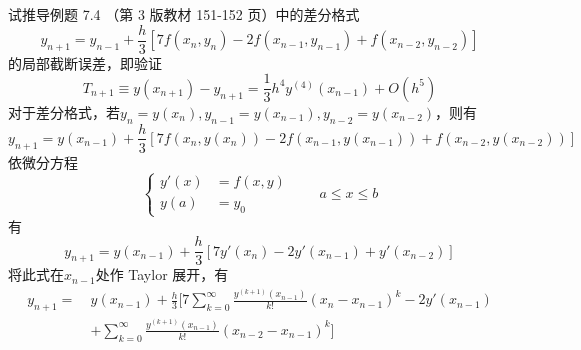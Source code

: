 \documentclass[11pt]{article}
\begin{document}
\maketitle

\thispagestyle{empty}

\newpage

\begin{question}

    \questiontext
    {
        试推导例题 7.4 （第 3 版教材 151-152 页）中的差分格式
        $$
            y_{n + 1} = y_{n - 1} + \frac{h}{3}\left[7f(x_{n}, y_{n}) - 2f(x_{n - 1}, y_{n - 1}) + f(x_{n - 2}, y_{n - 2})\right]
        $$
        的局部截断误差，即验证
        \begin{equation*}
            T_{n + 1} \equiv y(x_{n + 1}) - y_{n + 1} = \frac{1}{3}h^4y^{(4)}(x_{n - 1}) + O(h^5)
        \end{equation*}
    }
    \answer
    {
        对于差分格式，若$y_{n} = y(x_{n}), y_{n - 1} = y(x_{n - 1}), y_{n - 2} = y(x_{n - 2})$，则有
        \begin{equation*}
            y_{n + 1} = y(x_{n - 1}) + \frac{h}{3}\left[7f(x_{n}, y(x_{n    })) - 2f(x_{n - 1}, y(x_{n - 1})) + f(x_{n - 2}, y(x_{n - 2}))\right]
        \end{equation*}
        依微分方程
        \begin{equation}
            \left\{
            \begin{aligned}
                y'(x) & = f(x, y) \\
                y(a)  & = y_0
            \end{aligned}
            \right.
            \qquad a \leqslant x \leqslant b \tag{1}\label{ODE}
        \end{equation}
        有
        \begin{equation*}
            y_{n + 1} = y(x_{n - 1}) + \frac{h}{3}\left[7y'(x_{n}) - 2y'(x_{n - 1}) + y'(x_{n - 2})\right]
        \end{equation*}
        将此式在$x_{n - 1}$处作 Taylor 展开，有
        \begin{align*}
            y_{n + 1} =\  & y(x_{n - 1}) + \frac{h}{3}\Bigg[7\sum_{k = 0}^{\infty}\frac{y^{(k + 1)}(x_{n - 1})}{k!}(x_{n    } - x_{n - 1})^k - 2y'(x_{n - 1})                                                                      \\
                          & + \sum_{k = 0}^{\infty}\frac{y^{(k + 1)}(x_{n - 1})}{k!}(x_{n - 2} - x_{n - 1})^k\Bigg]                                                                                                                \\

\end{align*}}
\end{question}
\end{document}
